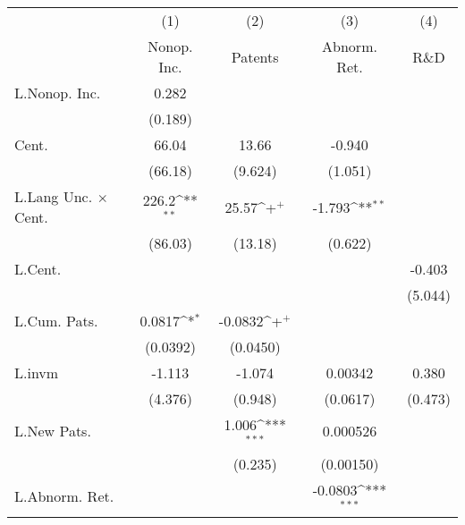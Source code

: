 {
\def\sym#1{\ifmmode^{#1}\else\(^{#1}\)\fi}
\begin{tabular}{l*{4}{c}}
\hline\hline
                    &\multicolumn{1}{c}{(1)}&\multicolumn{1}{c}{(2)}&\multicolumn{1}{c}{(3)}&\multicolumn{1}{c}{(4)}\\
                    &\multicolumn{1}{c}{Nonop. Inc.}&\multicolumn{1}{c}{Patents}&\multicolumn{1}{c}{Abnorm. Ret.}&\multicolumn{1}{c}{R\&D}\\
\hline
L.Nonop. Inc.       &       0.282         &                     &                     &                     \\
                    &     (0.189)         &                     &                     &                     \\
Cent.               &       66.04         &       13.66         &      -0.940         &                     \\
                    &     (66.18)         &     (9.624)         &     (1.051)         &                     \\
L.Lang Unc. $\times$ Cent.&       226.2\sym{**} &       25.57\sym{+}  &      -1.793\sym{**} &                     \\
                    &     (86.03)         &     (13.18)         &     (0.622)         &                     \\
L.Cent.             &                     &                     &                     &      -0.403         \\
                    &                     &                     &                     &     (5.044)         \\
L.Cum. Pats.        &      0.0817\sym{*}  &     -0.0832\sym{+}  &                     &                     \\
                    &    (0.0392)         &    (0.0450)         &                     &                     \\
L.invm              &      -1.113         &      -1.074         &     0.00342         &       0.380         \\
                    &     (4.376)         &     (0.948)         &    (0.0617)         &     (0.473)         \\
L.New Pats.         &                     &       1.006\sym{***}&    0.000526         &                     \\
                    &                     &     (0.235)         &   (0.00150)         &                     \\
L.Abnorm. Ret.      &                     &                     &     -0.0803\sym{***}&                     \\

\end{tabular}}
